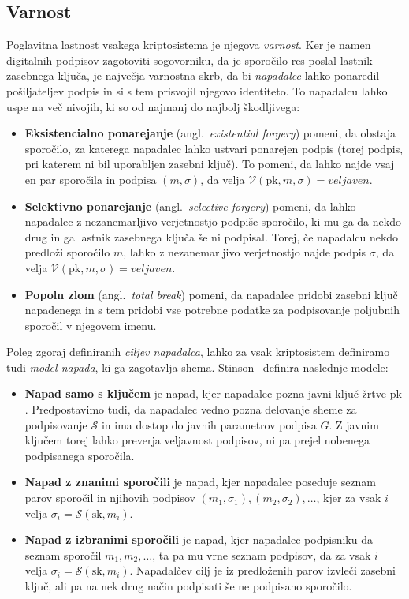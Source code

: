 \documentclass[isrm2, tisk]{fmfdelo}
\begin{document}
\subsection{Varnost}
Poglavitna lastnost vsakega kriptosistema je njegova \textit{varnost}. Ker je namen digitalnih podpisov
zagotoviti sogovorniku, da je sporočilo res poslal lastnik zasebnega ključa, je največja varnostna
skrb, da bi \textit{napadalec} lahko ponaredil pošiljateljev podpis in si s tem prisvojil njegovo 
identiteto. To napadalcu lahko uspe na več nivojih, ki so od najmanj do najbolj škodljivega:

\begin{itemize}
    \item \textbf{Eksistencialno ponarejanje} (angl.\ \textit{existential forgery}) pomeni, da obstaja
        sporočilo, za katerega napadalec lahko ustvari ponarejen podpis (torej podpis, pri katerem
        ni bil uporabljen zasebni ključ). To pomeni, da lahko najde vsaj en par sporočila in podpisa
        $(m, \sigma)$, da velja $\mathcal{V}(\text{pk}, m, \sigma) = veljaven$.
    \item \textbf{Selektivno ponarejanje} (angl.\ \textit{selective forgery}) pomeni, da lahko napadalec 
        z nezanemarljivo verjetnostjo podpiše sporočilo, ki mu ga da nekdo drug in ga lastnik zasebnega
        ključa še ni podpisal. Torej, če napadalcu nekdo predloži sporočilo $m$, lahko z nezanemarljivo 
        verjetnostjo najde podpis $\sigma$, da velja $\mathcal{V}(\text{pk}, m, \sigma) = veljaven$.
    \item \textbf{Popoln zlom} (angl.\ \textit{total break}) pomeni, da napadalec pridobi 
        zasebni ključ napadenega in s tem pridobi vse potrebne podatke za podpisovanje poljubnih
        sporočil v njegovem imenu.
\end{itemize}

Poleg zgoraj definiranih \textit{ciljev napadalca}, lahko za vsak kriptosistem definiramo tudi
\textit{model napada}, ki ga zagotavlja shema. Stinson~\cite{stinson2023crypto} definira naslednje
modele:
\begin{itemize}
    \item \textbf{Napad samo s ključem} je napad, kjer napadalec pozna javni ključ žrtve $\text{pk}$. 
        Predpostavimo tudi, da napadalec vedno pozna delovanje sheme za podpisovanje $\mathcal{S}$
        in ima dostop do javnih parametrov podpisa $G$. Z javnim ključem torej lahko preverja
        veljavnost podpisov, ni pa prejel nobenega podpisanega sporočila.
    \item \textbf{Napad z znanimi sporočili} je napad, kjer napadalec poseduje seznam parov sporočil 
        in njihovih podpisov $(m_1, \sigma_1), (m_2, \sigma_2), \dots$, kjer za vsak $i$ velja 
        $\sigma_i = \mathcal{S}(\text{sk}, m_i)$.
    \item \textbf{Napad z izbranimi sporočili} je napad, kjer napadalec podpisniku da seznam sporočil $m_1,
        m_2, \dots$, ta pa mu vrne seznam podpisov, da za vsak $i$ velja $\sigma_i = \mathcal{S}(\text{sk}, 
        m_i)$. Napadalčev cilj je iz predloženih parov izvleči zasebni ključ, ali pa na nek drug način
        podpisati še ne podpisano sporočilo.
\end{itemize}
\end{document}

